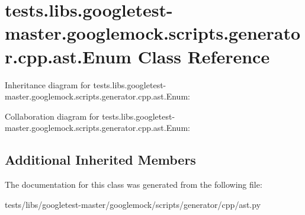 \hypertarget{classtests_1_1libs_1_1googletest-master_1_1googlemock_1_1scripts_1_1generator_1_1cpp_1_1ast_1_1Enum}{}\section{tests.\+libs.\+googletest-\/master.googlemock.\+scripts.\+generator.\+cpp.\+ast.\+Enum Class Reference}
\label{classtests_1_1libs_1_1googletest-master_1_1googlemock_1_1scripts_1_1generator_1_1cpp_1_1ast_1_1Enum}


Inheritance diagram for tests.\+libs.\+googletest-\/master.googlemock.\+scripts.\+generator.\+cpp.\+ast.\+Enum\+:


Collaboration diagram for tests.\+libs.\+googletest-\/master.googlemock.\+scripts.\+generator.\+cpp.\+ast.\+Enum\+:
\subsection*{Additional Inherited Members}


The documentation for this class was generated from the following file\+:\begin{DoxyCompactItemize}
\item 
tests/libs/googletest-\/master/googlemock/scripts/generator/cpp/ast.\+py\end{DoxyCompactItemize}
